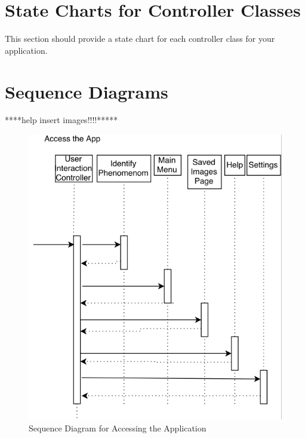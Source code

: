 \documentclass[]{article}
\begin{document}

\section{State Charts for Controller Classes}
\label{sec:state_charts_for_controller_classes}
This section should provide a state chart for each controller class for your application.

\section{Sequence Diagrams}
\label{sec:sequence_diagrams}
****help insert images!!!!*****
\begin{figure}[!hb]
	\includegraphics[width=\linewidth]{sequenceDiagram1.png}
	\caption{Sequence Diagram for Accessing the Application}
\end{figure}
\end{document}
